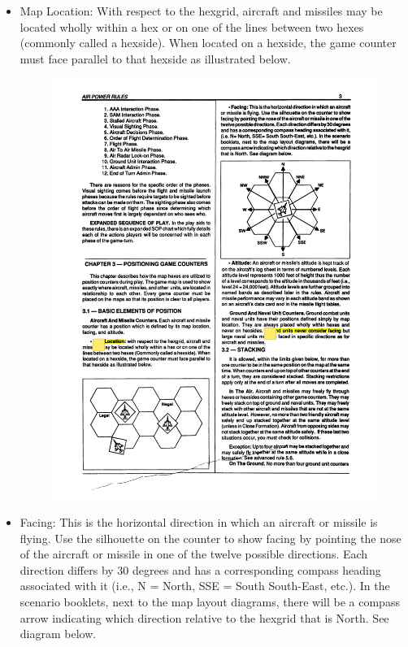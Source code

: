 \begin{itemize}
    \item Map Location: With respect to the hexgrid, aircraft and missiles may be located wholly within a hex or on one of the lines between two hexes (commonly called a hexside). When located on a hexside, the game counter must face parallel to that hexside as illustrated below. 
    \begin{figure}[!ht]
    \centering
    \includegraphics[width=0.7\linewidth]{figures/figure-C.pdf}
    \end{figure}
    \item Facing: This is the horizontal direction in which an aircraft or missile is flying. Use the silhouette on the counter to show facing by pointing the nose of the aircraft or missile in one of the twelve possible directions. Each direction differs by 30 degrees and has a corresponding compass heading associated with it (i.e., N = North, SSE = South South-East, etc.). In the scenario booklets, next to the map layout diagrams, there will be a compass arrow indicating which direction relative to the hexgrid that is North. See diagram below.
    \begin{figure}[!ht]
    \centering

\end{figure}
\end{itemize}
